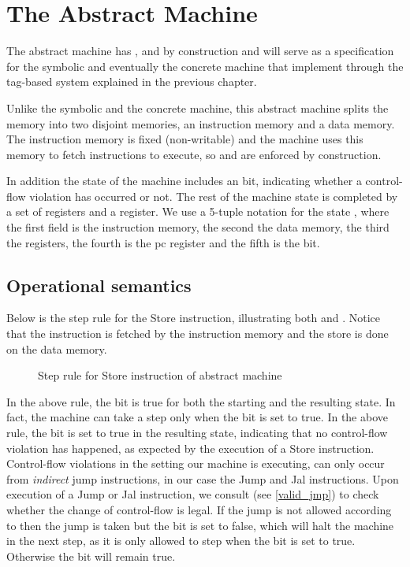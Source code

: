 \section{The Abstract Machine}\label{sec:abstract_cfi}

The abstract machine
has \CFI, \NXD and \NWC by construction and will serve as a 
specification for the symbolic and eventually the concrete machine that
implement \CFI through the tag-based system explained in the previous chapter.

Unlike the symbolic and the concrete machine, this abstract machine splits the 
memory into two disjoint memories, an instruction memory and a data memory. The
instruction memory is fixed (non-writable) and the machine uses this memory to
fetch instructions to execute, so \NWC and \NXD are enforced by construction.

In addition the state of the machine includes an \ok bit, indicating 
whether a control-flow violation has occurred or not. The rest of the machine
state is completed by a set of registers and a \pc register. We use a 5-tuple
notation for the state \acfistat{\imem}{\dmem}{\reg}{\pc}{\ok}, where the first
field is the instruction memory, the second the data memory, the third the
registers, the fourth is the pc register and the fifth is the \ok bit.

\subsection{Operational semantics}\label{sec:abstract_semantics}
Below is the step rule for the Store instruction, illustrating both \NWC and 
\NXD. Notice that the instruction is fetched by the instruction memory and
the store is done on the data memory.

\begin{figure}[!htb]
\caption{Step rule for Store instruction of abstract machine}
\end{figure}

In the above rule, the \ok bit is true for both the starting and the
resulting state. In fact, the machine can take a step only when the
\ok bit is set to true. In the above rule, the \ok bit is set to true
in the resulting state, indicating that no control-flow violation has
happened, as expected by the execution of a Store
instruction. Control-flow violations in the \NWC setting our machine
is executing, can only occur from \emph{indirect} jump instructions,
in our case the Jump and Jal instructions. Upon execution of a Jump or
Jal instruction, we consult \J (see \cref{valid_jmp}) to check
whether the change of control-flow is legal. If the jump is not
allowed according to \J then the jump is taken but the \ok bit is set
to false, which will halt the machine in the next step, as it is only
allowed to step when the \ok bit is set to true. Otherwise the \ok bit
will remain true.

